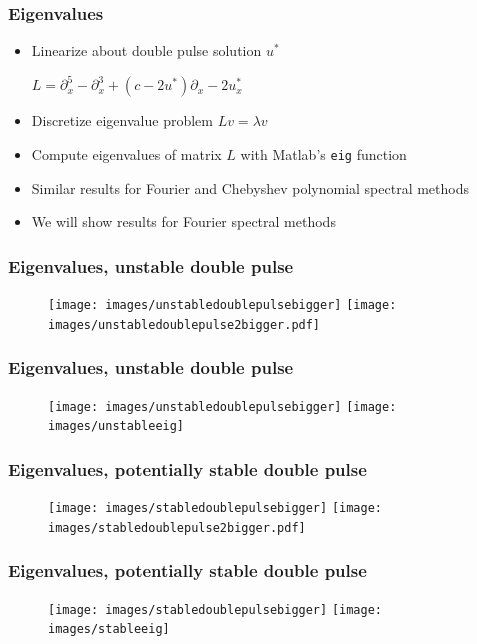 \documentclass[16pt]{beamer}
\begin{document}
\begin{frame}
	\frametitle{Eigenvalues}
	\fontsize{16}{7.2}\selectfont
	\begin{itemize}
		\item Linearize about double pulse solution $u^*$
		\begin{center}
		$L = \partial_x^5 - \partial_x^3 + (c - 2 u^*)\partial_x - 2 u^*_x $
		\end{center}
		\item Discretize eigenvalue problem $Lv = \lambda v$
		\vspace{0.5cm}
		\item Compute eigenvalues of matrix $L$ with Matlab's \texttt{eig} function
		\vspace{0.5cm}
		\item Similar results for Fourier and Chebyshev polynomial spectral methods
		\vspace{0.5cm}
		\item We will show results for Fourier spectral methods
	\end{itemize}
\end{frame}

\begin{frame}
	\frametitle{Eigenvalues, unstable double pulse}
	\fontsize{16}{7.2}\selectfont
	\begin{figure}
   		\texttt{[image: images/unstabledoublepulsebigger]}
   		\hfill
   		\texttt{[image: images/unstabledoublepulse2bigger.pdf]}
	\end{figure}
\end{frame}

\begin{frame}
	\frametitle{Eigenvalues, unstable double pulse}
	\fontsize{16}{7.2}\selectfont
	\begin{figure}
   		\texttt{[image: images/unstabledoublepulsebigger]}
   		\hfill
   		\texttt{[image: images/unstableeig]}
	\end{figure}
\end{frame}

\begin{frame}
	\frametitle{Eigenvalues, potentially stable double pulse}
	\fontsize{16}{7.2}\selectfont
	\begin{figure}
   		\texttt{[image: images/stabledoublepulsebigger]}
   		\hfill
   		\texttt{[image: images/stabledoublepulse2bigger.pdf]}
	\end{figure}
\end{frame}

\begin{frame}
	\frametitle{Eigenvalues, potentially stable double pulse}
	\fontsize{16}{7.2}\selectfont
	\begin{figure}
   		\texttt{[image: images/stabledoublepulsebigger]}
   		\hfill
   		\texttt{[image: images/stableeig]}
	\end{figure}
\end{frame}
\end{document}
